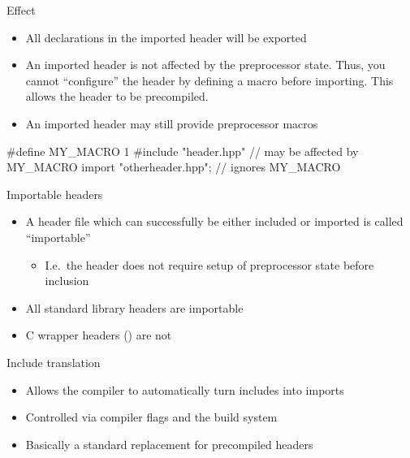 \begin{frame}[fragile]
    \begin{block}{Effect}
      \begin{itemize}
      \item All declarations in the imported header will be exported
      \item An imported header is not affected by the preprocessor state.
            Thus, you cannot ``configure'' the header by defining a macro before importing.
            This allows the header to be precompiled.
      \item An imported header may still provide preprocessor macros
      \end{itemize}
    \end{block}
    \begin{cppcode}
      #define MY_MACRO 1
      #include "header.hpp" // may be affected by MY_MACRO
      import "otherheader.hpp"; // ignores MY_MACRO
    \end{cppcode}
\end{frame}

\begin{frame}[fragile]
    \begin{block}{Importable headers}
      \begin{itemize}
      \item A header file which can successfully be either included or imported is called ``importable''
      \begin{itemize}
        \item I.e.\ the header does not require setup of preprocessor state before inclusion
      \end{itemize}
      \item All \cpp standard library headers are importable
      \item C wrapper headers () are not
      \end{itemize}
    \end{block}
    \begin{block}{Include translation}
      \begin{itemize}
        \item Allows the compiler to automatically turn includes into imports
        \item Controlled via compiler flags and the build system
        \item Basically a standard replacement for precompiled headers
      \end{itemize}
    \end{block}
\end{frame}


